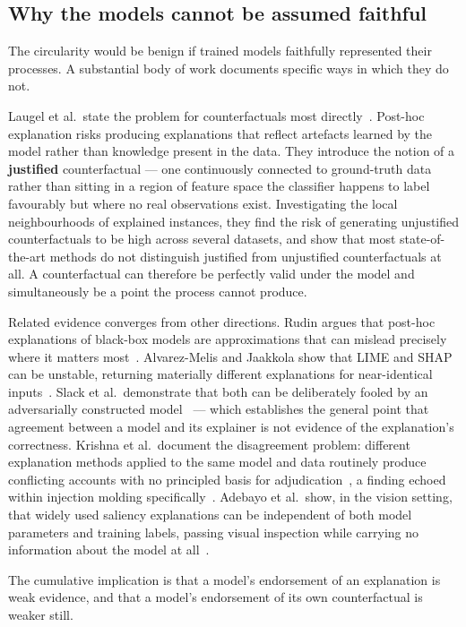 \documentclass[11pt,a4paper]{article}
\begin{document}
\subsection{Why the models cannot be assumed faithful}

The circularity would be benign if trained models faithfully represented their processes. A substantial body of work documents specific ways in which they do not.

Laugel et al.\ state the problem for counterfactuals most directly~\cite{laugel2019}. Post-hoc explanation risks producing explanations that reflect artefacts learned by the model rather than knowledge present in the data. They introduce the notion of a \textbf{justified} counterfactual --- one continuously connected to ground-truth data rather than sitting in a region of feature space the classifier happens to label favourably but where no real observations exist. Investigating the local neighbourhoods of explained instances, they find the risk of generating unjustified counterfactuals to be high across several datasets, and show that most state-of-the-art methods do not distinguish justified from unjustified counterfactuals at all. A counterfactual can therefore be perfectly valid under the model and simultaneously be a point the process cannot produce.

Related evidence converges from other directions. Rudin argues that post-hoc explanations of black-box models are approximations that can mislead precisely where it matters most~\cite{rudin2019}. Alvarez-Melis and Jaakkola show that LIME and SHAP can be unstable, returning materially different explanations for near-identical inputs~\cite{alvarezmelis2018}. Slack et al.\ demonstrate that both can be deliberately fooled by an adversarially constructed model~\cite{slack2020} --- which establishes the general point that agreement between a model and its explainer is not evidence of the explanation's correctness. Krishna et al.\ document the disagreement problem: different explanation methods applied to the same model and data routinely produce conflicting accounts with no principled basis for adjudication~\cite{krishna2022}, a finding echoed within injection molding specifically~\cite{muaz}. Adebayo et al.\ show, in the vision setting, that widely used saliency explanations can be independent of both model parameters and training labels, passing visual inspection while carrying no information about the model at all~\cite{adebayo2018}.

The cumulative implication is that a model's endorsement of an explanation is weak evidence, and that a model's endorsement of its own counterfactual is weaker still.
\end{document}
